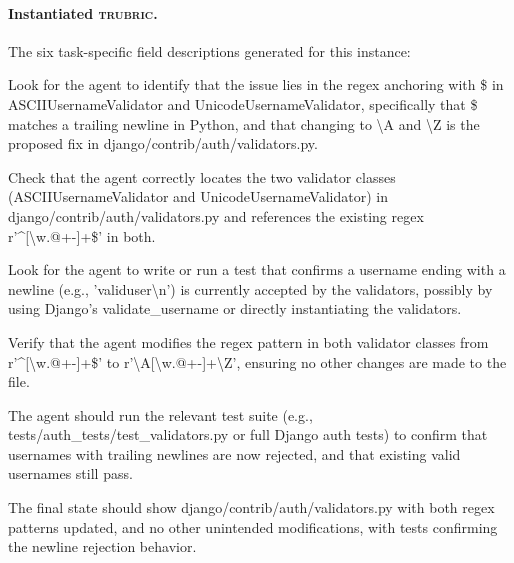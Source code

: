 \documentclass{article}
\newcommand{\trubric}{\textsc{trubric}}
\begin{document}
\paragraph{Instantiated \trubric{}.} The six task-specific field descriptions generated for this instance:
\begin{description}[itemsep=1pt, topsep=2pt]\small
\item[understanding] Look for the agent to identify that the issue lies in the regex anchoring with \$ in ASCIIUsernameValidator and UnicodeUsernameValidator, specifically that \$ matches a trailing newline in Python, and that changing to \textbackslash{}A and \textbackslash{}Z is the proposed fix in django/contrib/auth/validators.py.
\item[localization] Check that the agent correctly locates the two validator classes (ASCIIUsernameValidator and UnicodeUsernameValidator) in django/contrib/auth/validators.py and references the existing regex r'\textasciicircum{}[\textbackslash{}w.@+-]+\$' in both.
\item[reproduction] Look for the agent to write or run a test that confirms a username ending with a newline (e.g., 'validuser\textbackslash{}n') is currently accepted by the validators, possibly by using Django's validate\_username or directly instantiating the validators.
\item[editing] Verify that the agent modifies the regex pattern in both validator classes from r'\textasciicircum{}[\textbackslash{}w.@+-]+\$' to r'\textbackslash{}A[\textbackslash{}w.@+-]+\textbackslash{}Z', ensuring no other changes are made to the file.
\item[verification] The agent should run the relevant test suite (e.g., tests/auth\_tests/test\_validators.py or full Django auth tests) to confirm that usernames with trailing newlines are now rejected, and that existing valid usernames still pass.
\item[final state] The final state should show django/contrib/auth/validators.py with both regex patterns updated, and no other unintended modifications, with tests confirming the newline rejection behavior.
\end{description}
\end{document}
